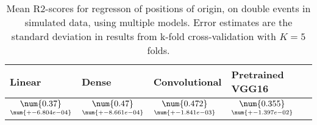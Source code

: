 \begin{table}
\centering
\caption{
Mean R2-scores for regresson of positions of origin, on double events in simulated data, using multiple models. 
Error estimates are the standard deviation in results from k-fold cross-validation 
with $K=5$ folds.
}
\label{tab:regression-simulated-double-position-pixelmod-r2}
\begin{tabular}{llll}
\toprule
                                            Linear &                                              Dense &                                       Convolutional &                                    Pretrained VGG16 \\
\midrule
 $\underset{\num{+- 6.804e-04 }  }{\num{ 0.37 } }$ &  $\underset{\num{+- 8.661e-04 }  }{\num{ 0.47 } }$ &  $\underset{\num{+- 1.841e-03 }  }{\num{ 0.472 } }$ &  $\underset{\num{+- 1.397e-02 }  }{\num{ 0.355 } }$ \\
\bottomrule
\end{tabular}
\end{table}
